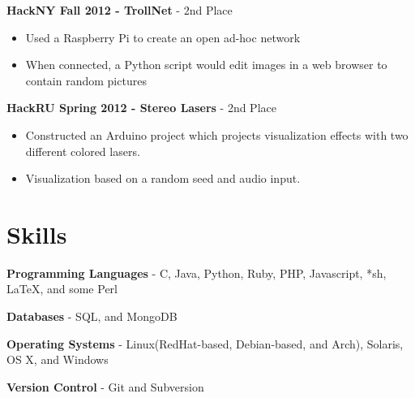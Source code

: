 \documentclass[margin]{res}
\begin{document}
\begin{resume}
	{\bf HackNY Fall 2012 - TrollNet} - 2nd Place
	\begin{itemize} \itemsep -2pt
		\item Used a Raspberry Pi to create an open ad-hoc network
		\item When connected, a Python script would edit images in a web browser to contain random pictures
	\end{itemize}

	{\bf HackRU Spring 2012 - Stereo Lasers} - 2nd Place
	\begin{itemize} \itemsep -2pt
		\item Constructed an Arduino project which projects visualization effects with two different colored lasers.
		\item Visualization based on a random seed and audio input.
	\end{itemize}

\section{Skills}
	{\bf Programming Languages} - C, Java, Python, Ruby, PHP, Javascript, *sh,
    LaTeX, and some Perl

	{\bf Databases} - SQL, and MongoDB

	{\bf Operating Systems} - Linux(RedHat-based, Debian-based, and Arch), Solaris, OS X, and Windows

	{\bf Version Control} - Git and Subversion


\end{resume} 
\end{document}
